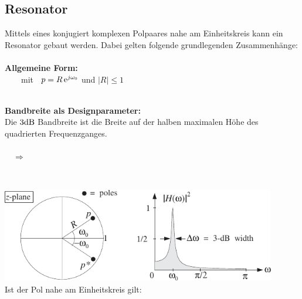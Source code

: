 	\subsection{Resonator}
		Mittels eines konjugiert komplexen Polpaares nahe am Einheitskreis kann ein Resonator gebaut werden. Dabei gelten folgende grundlegenden Zusammenhänge:\\[0.2cm]
		\\[0.3cm]
		\textbf{Allgemeine Form:}$\qquad$\\[0.2cm]
		$\qquad$mit $\;\; p = R\,\mathrm{e}^{j\omega_0}$ und $|R|\leq 1$\\[0.2cm]
		$\qquad$
		\\
		\begin{minipage}{0.47\textwidth}
			\textbf{Bandbreite als Designparameter:}\\[0.2cm]
			Die $3\text{dB}$ Bandbreite ist die Breite auf der halben maximalen Höhe des quadrierten Frequenzganges.\\[0.2cm]
			\text{\textcolor{white}{$\Rightarrow\quad$}}$\qquad$
			\\[0.2cm]$\quad\Rightarrow\quad$
		\end{minipage}\begin{minipage}{0.03\textwidth}$ $\end{minipage}
		\begin{minipage}{0.55\textwidth}
			\includegraphics[width = 0.9\textwidth]{pic/resonator.pdf}\\[0.2cm]
			Ist der Pol nahe am Einheitskreis gilt:$\quad$
		\end{minipage}\\[0.2cm]
		
